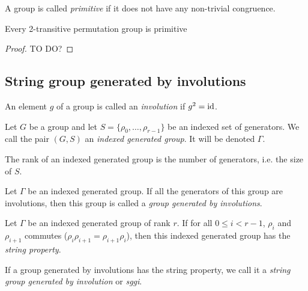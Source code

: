 \begin{definition}
  A group is called \textit{primitive} if it does not have any non-trivial congruence.
\end{definition}

\begin{property}
  Every 2-transitive permutation group is primitive
\end{property}

\begin{proof}
  TO DO?
\end{proof}

\subsection{String group generated by involutions}

\begin{definition}[Involution]
  An element $g$ of a group is called an \textit{involution} if $g^2 = \operatorname{id}$.
\end{definition}

\begin{definition}
  Let $G$ be a group and let $S = \{\rho_0, \dots, \rho_{r-1}\}$ be an indexed set of generators.
  We call the pair $(G,S)$ an \textit{indexed generated group}. It will be denoted $\Gamma$.
\end{definition}

\begin{definition}
  The rank of an indexed generated group is the number of generators, i.e. the size of $S$.
\end{definition}

\begin{definition}
  Let $\Gamma$ be an indexed generated group. If all the generators of this group are involutions, then this group is called a \textit{group generated by involutions}.
\end{definition}

\begin{definition}
  Let $\Gamma$ be an indexed generated group of rank $r$. If for all $0 \le i < r-1$, $\rho_i$ and $\rho_{i+1}$ commutes ($\rho_i \rho_{i+1} = \rho_{i+1}\rho_i$), then this indexed generated group has the \textit{string property}.
\end{definition}

\begin{definition}
  If a group generated by involutions has the string property, we call it a \textit{string group generated by involution} or \textit{sggi}.
\end{definition}

